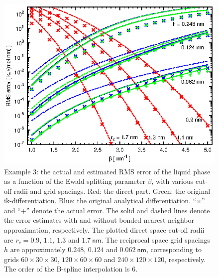 \documentclass[aps,pre,preprint,unsortedaddress]{revtex4}
\begin{document}
\begin{figure}
  \centering
  \includegraphics[]{fig.mesh.ik.ana.eps}
  \caption{Example 3: the actual and estimated RMS error of the liquid
    phase as a function of the Ewald splitting parameter $\beta$,
    with various cut-off radii and grid spacings.
    Red: the direct part. Green: the original ik-differentiation.
    Blue: the original analytical differentiation. ``$\times$'' and
    ``+'' denote the actual error.  The solid and dashed lines denote
    the error estimates with and without bonded nearest neighbor
    approximation, respectively. The plotted direct space cut-off radii are
    $r_c = 0.9$, $1.1$, $1.3$ and  $1.7\:\textsf{nm}$. The
    reciprocal space grid spacings $h$  are approximately
    $0.248$, $0.124$ and $0.062\:\textsf{nm}$, corresponding to
    grids $60\times 30\times 30$, $120\times 60\times 60$ and
    $240\times 120\times 120$, respectively. The order of the B-spline
    interpolation is 6.
  }
  \label{fig:tmp-add1}
\end{figure}
\end{document}
